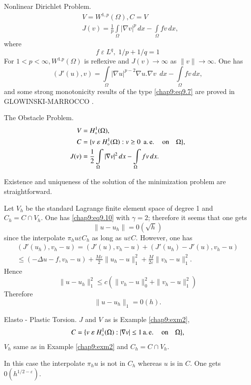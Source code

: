 \setcounter{exam}{0}
\begin{exam}\label{chap9:exm1}
{Nonlinear Dirichlet Problem.}\pageoriginale 
\begin{align*}
&V=W^{1,p}(\Omega), C=V\\
&J(v)=\frac{1}{p}\int\limits_\Omega|\nabla v|^p\,dx-\int\limits_\Omega
  fv \,dx,
\end{align*}
where
$$
f\;\varepsilon \;L^q, \;1/p+1/q=1
$$
For $1<p<\infty, W^{1.p}(\Omega)$ is reflexive and $J(v)\to\infty$ as
$\parallel v\parallel \to\infty$. One has 
$$
(J'(u),v)=\int\limits_\Omega |\nabla u|^{p-2}\nabla u.\nabla v\;\,dx-
\int\limits_\Omega fv\,dx,
$$
and some strong monotonicity results of the type \eqref{chap9:eq9.7}
are proved in GLOWINSKI-MARROCCO \cite{key19}.
\end{exam}
 
\begin{exam}\label{chap9:exm2}
{The Obstacle Problem.}
\begin{align*}
V &= H_\circ^1(\Omega),\\
C &=\{v\;\varepsilon \;H_\circ^1(\Omega):v\geq 0 \;\operatorname{a.e.}\quad
\text{on}\quad \Omega\},\\
J(v) &= \frac{1}{2}\int\limits_\Omega|\nabla v|^2\,dx-
\int\limits_\Omega fv \,dx.
\end{align*}

Existence and uniqueness of the solution of the minimization problem
are straightforward.

Let $V_h$ be the standard Lagrange finite element space of degree 1
and $C_h=C\cap V_h$. One has \eqref{chap9:eq9.10} with $\gamma=2$;
therefore it seems that one gets 
$$
\parallel u-u_h\parallel=0(\sqrt{h})
$$\pageoriginale
since the interpolate $\pi_h u\varepsilon C_h$ as long as
$u\varepsilon C$. However, one has 
\begin{gather*}
(J'(u_h),v_h-u)=(J'(u),v_h-u)+(J'(u_h)-J'(u),v_h-u)\\
\leq(-\Delta u-f,v_h-u)+\frac{M\varepsilon}{2}\parallel u_h-u
\parallel_1^2+ \frac{M}{2\varepsilon}\parallel v_h-u\parallel_1^2. 
\end{gather*}
Hence
$$
\parallel u-u_h\parallel_1^2\leq c\left(\parallel v_h-u\parallel_0^2
+\parallel v_h-u\parallel_1^2\right)
$$
Therefore
$$
\parallel u-u_h\parallel_1=0(h).
$$
\end{exam}

\begin{exam}\label{chap9:exm3}
{Elasto - Plastic Torsion.} $J$ and $V$ as is Example
\ref{chap9:exm2}, 
$$
C=\{v\;\varepsilon \;H_\circ^1(\Omega):|\nabla v|\leq 1\operatorname{a.e.}
\quad\text{on}\quad\Omega\},
$$
$V_h$ same as in Example \ref{chap9:exm2} and $C_h=C\cap V_h$. 

In this case the interpolate $\pi_hu$ is not in $C_h$ whereas $u$ is
in $C$. One gets $0(h^{1/2-\varepsilon})$.
\end{exam}

